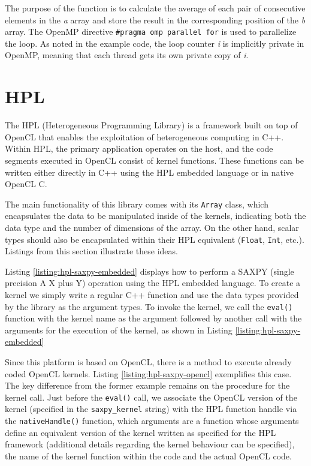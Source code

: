 The purpose of the function is to calculate the average of each pair of consecutive elements in the \textit{a} array and store the result in the corresponding position of the \textit{b} array.
The OpenMP directive \texttt{\#pragma omp parallel for} is used to parallelize the loop.
As noted in the example code, the loop counter \textit{i} is implicitly private in OpenMP, meaning that each thread gets its own private copy of \textit{i}.

\section{HPL}

The HPL (Heterogeneous Programming Library) \cite{Viñas:2018:Heterogeneous} is a framework built on top of OpenCL that enables the exploitation of heterogeneous computing in C++.
Within HPL, the primary application operates on the host, and the code segments executed in OpenCL consist of kernel functions.
These functions can be written either directly in C++ using the HPL embedded language or in native OpenCL C.

The main functionality of this library comes with its \texttt{Array} class, which encapsulates the data to be manipulated inside of the kernels, indicating both the data type and the number of dimensions of the array.
On the other hand, scalar types should also be encapsulated within their HPL equivalent (\texttt{Float}, \texttt{Int}, etc.).
Listings from this section illustrate these ideas.



Listing \ref{listing:hpl-saxpy-embedded} displays how to perform a SAXPY (single precision A X plus Y) operation using the HPL embedded language.
To create a kernel we simply write a regular C++ function and use the data types provided by the library as the argument types.
To invoke the kernel, we call the \texttt{eval()} function with the kernel name as the argument followed by another call with the arguments for the execution of the kernel, as shown in Listing \ref{listing:hpl-saxpy-embedded}

Since this platform is based on OpenCL, there is a method to execute already coded OpenCL kernels.
Listing \ref{listing:hpl-saxpy-opencl} exemplifies this case.
The key difference from the former example remains on the procedure for the kernel call.
Just before the \texttt{eval()} call, we associate the OpenCL version of the kernel (specified in the \texttt{saxpy\_kernel} string) with the HPL function handle via the \texttt{nativeHandle()} function, which arguments are a function whose arguments define an equivalent version of the kernel written as specified for the HPL framework (additional details regarding the kernel behaviour can be specified), the name of the kernel function within the code and the actual OpenCL code.
\pagebreak

